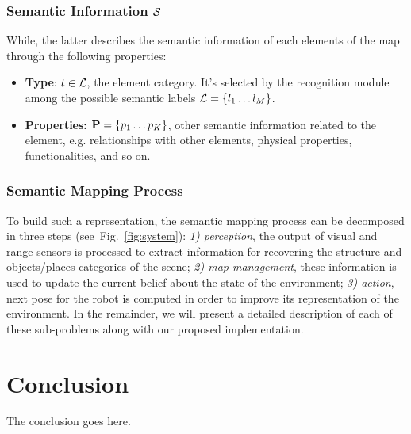 \documentclass[conference]{IEEEtran}
\def\figref#1{Fig.~\ref{#1}}
\begin{document}
\subsubsection{Semantic Information $\mathcal{S}$}

While, the latter describes the semantic information of each elements
of the map through the following properties:
\begin{itemize}
	\item {\bf Type}: $t \in \mathcal{L}$, the element category. It's selected
    by the recognition module among the possible semantic labels $\mathcal{L}
    = \{l_1 \dots l_M \}$.
	\item {\bf Properties:} $\mathbf{P} = \{ p_1 \dots p_K \}$, other semantic
    information related to the element, e.g. relationships with other
    elements, physical properties, functionalities, and so on.
\end{itemize}   

\subsubsection{Semantic Mapping Process}

To build such a representation, the semantic mapping process can be
decomposed in three steps (see~\figref{fig:system}): \emph{1)
  perception}, the output of visual and range sensors is processed to
extract information for recovering the structure and objects/places
categories of the scene; \emph{2) map management}, these information
is used to update the current belief about the state of the
environment; \emph{3) action}, next pose for the robot is computed in
order to improve its representation of the environment. In the
remainder, we will present a detailed description of each of these
sub-problems along with our proposed implementation.


\section{Conclusion}
The conclusion goes here.



%
%
%







\end{document}
